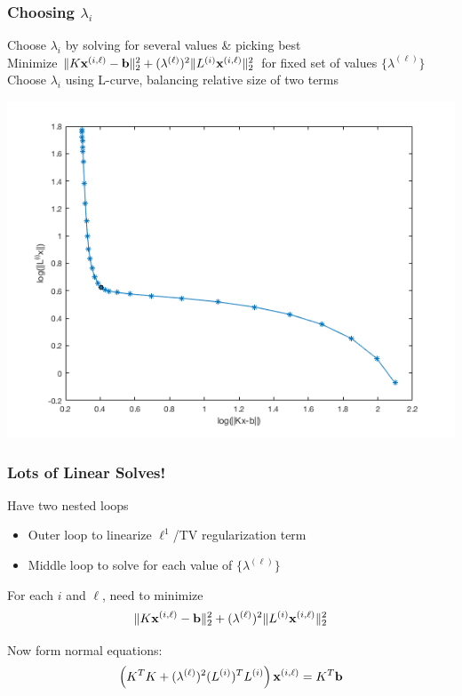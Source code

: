 \documentclass[12pt,t,xcolor=dvipsnames]{beamer}
\renewcommand{\vec}[1]{{\bf #1}}
\renewcommand{\vec}[1]{{\bf #1}}
\begin{document}
\begin{frame}
  \frametitle{Choosing $\lambda_i$}
  
  Choose $\lambda_i$ by solving for several values \& picking best \\[9pt]

Minimize $\|K\vec{x}^{(i,\ell)}-\vec{b}\|_2^2 + (\lambda^{(\ell)})^2\|L^{(i)}\vec{x}^{(i,\ell)}\|_2^2$
  for fixed set of values $\{\lambda^{(\ell)}\}$ \\[9pt]

  Choose $\lambda_i$ using L-curve, balancing relative size of two terms

  \begin{center}
      \includegraphics[width=0.65\linewidth]{Lcurve}
    \end{center}
  
\end{frame}

\begin{frame}
  \frametitle{Lots of Linear Solves!}

  Have two nested loops
  \begin{itemize}
  \item Outer loop to linearize $\ell^1$/TV regularization term
  \item Middle loop to solve for each value of
      $\{\lambda^{(\ell)}\}$
    
  \end{itemize}

  For each $i$ and $\ell$, need to minimize
  \[
\|K\vec{x}^{(i,\ell)}-\vec{b}\|_2^2 + (\lambda^{(\ell)})^2\|L^{(i)}\vec{x}^{(i,\ell)}\|_2^2
\]

Now form normal equations:
\[
\left(K^TK + (\lambda^{(\ell)})^2(L^{(i)})^TL^{(i)}\right)\vec{x}^{(i,\ell)} = K^T\vec{b}
\]
\end{frame}
\end{document}
